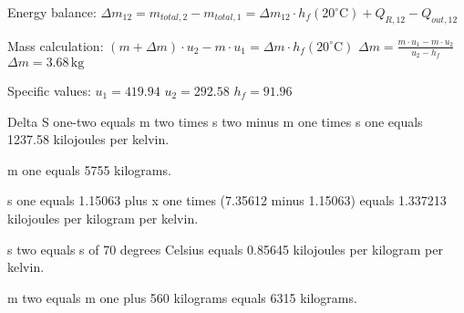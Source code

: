 Energy balance:  
\( \Delta m_{12} = m_{total,2} - m_{total,1} = \Delta m_{12} \cdot h_f(20^\circ \text{C}) + Q_{R,12} - Q_{out,12} \)  

Mass calculation:  
\( (m + \Delta m) \cdot u_2 - m \cdot u_1 = \Delta m \cdot h_f(20^\circ \text{C}) \)  
\( \Delta m = \frac{m \cdot u_1 - m \cdot u_2}{u_2 - h_f} \)  
\( \Delta m = 3.68 \, \text{kg} \)  

Specific values:  
\( u_1 = 419.94 \)  
\( u_2 = 292.58 \)  
\( h_f = 91.96 \)

Delta S one-two equals m two times s two minus m one times s one equals 1237.58 kilojoules per kelvin.  

m one equals 5755 kilograms.  

s one equals 1.15063 plus x one times (7.35612 minus 1.15063) equals 1.337213 kilojoules per kilogram per kelvin.  

s two equals s of 70 degrees Celsius equals 0.85645 kilojoules per kilogram per kelvin.  

m two equals m one plus 560 kilograms equals 6315 kilograms.